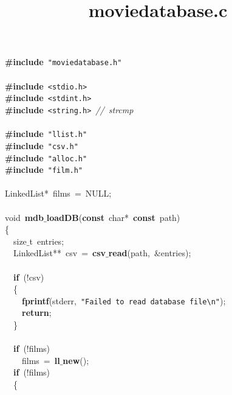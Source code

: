 \documentclass{article}
\title{moviedatabase.c}
\date{}
\begin{document}
\maketitle

\noindent
\mbox{}\textbf{\#include}\ \texttt{"{}moviedatabase.h"{}} \\
\mbox{} \\
\mbox{}\textbf{\#include}\ \texttt{\textless{}stdio.h\textgreater{}} \\
\mbox{}\textbf{\#include}\ \texttt{\textless{}stdint.h\textgreater{}} \\
\mbox{}\textbf{\#include}\ \texttt{\textless{}string.h\textgreater{}}\ \textit{//\ strcmp} \\
\mbox{} \\
\mbox{}\textbf{\#include}\ \texttt{"{}llist.h"{}} \\
\mbox{}\textbf{\#include}\ \texttt{"{}csv.h"{}} \\
\mbox{}\textbf{\#include}\ \texttt{"{}alloc.h"{}} \\
\mbox{}\textbf{\#include}\ \texttt{"{}film.h"{}} \\
\mbox{} \\
\mbox{}LinkedList*\ films\ =\ NULL; \\
\mbox{} \\
\mbox{}void\ \textbf{mdb$\_$loadDB}(\textbf{const}\ char*\ \textbf{const}\ path) \\
\mbox{}\{ \\
\mbox{}\ \ size$\_$t\ entries; \\
\mbox{}\ \ LinkedList**\ csv\ =\ \textbf{csv$\_$read}(path,\ \&entries); \\
\mbox{} \\
\mbox{}\ \ \textbf{if}\ (!csv) \\
\mbox{}\ \ \{ \\
\mbox{}\ \ \ \ \textbf{fprintf}(stderr,\ \texttt{"{}Failed\ to\ read\ database\ file}\texttt{\textbackslash{}n}\texttt{"{}}); \\
\mbox{}\ \ \ \ \textbf{return}; \\
\mbox{}\ \ \} \\
\mbox{} \\
\mbox{}\ \ \textbf{if}\ (!films) \\
\mbox{}\ \ \ \ films\ =\ \textbf{ll$\_$new}(); \\
\mbox{}\ \ \textbf{if}\ (!films) \\
\mbox{}\ \ \{ \\
\end{document}
